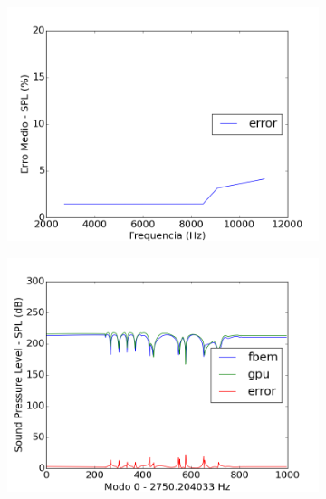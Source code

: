 \begin{figure}[ht]
\centering
\begin{subfigure}{0.6\textwidth}
\centering
\includegraphics[width=\textwidth]{../data/transfer_test/steel_key/plots/steel_key_error.png}
\end{subfigure}
\begin{subfigure}{0.45\textwidth}
	\centering
	\includegraphics[width=\textwidth]{../data/transfer_test/steel_key/plots/steel_key-tfv-0_0.png}
	\caption{}
	\label{fig:coef_key_0}
\end{subfigure}%
\begin{subfigure}{0.45\textwidth}
	\centering

\end{subfigure}
\end{figure}

